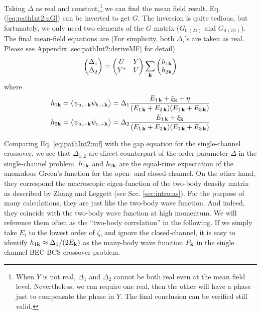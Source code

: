  
 Taking $\Delta$ as real and constant,\footnote{\label{foot:pathInt2:real}When $Y$ is not real, $\Delta_{1}$ and $\Delta_{2}$ cannot be both real even at the mean field level.  Nevertheless, we can require one  real, then the other will have a phase just to compensate the phase in $Y$.  The final conclusion can be verified  still valid.   }
  we can find the mean field result. Eq. (\ref{eq:pathInt2:nG}) can be inverted to get $G$.  The inversion is quite tedious, but fortunately, we only need two elements of the $G$ matrix ($G_{0\, (21)}$ and $G_{0 \,(31)}$).  The final mean-field equations are (For simplicity,  both $\Delta_{i}$'s are taken as real. Please see Appendix \ref{sec:pathInt2:deriveMF} for detail) 
  \begin{equation}\label{eq:pathInt2:mf}
\begin{pmatrix}\Delta_1\\\Delta_2\end{pmatrix}=\begin{pmatrix}U&Y\\Y^{*}&V\end{pmatrix}\sum_{\mathbf{k}}\begin{pmatrix}h_{1\mathbf{k}}\\h_{2\mathbf{k}}\end{pmatrix}
\end{equation}
  where 
  \begin{gather}
  h_{1\mathbf{k}}=\bigl<{\psi_{a,-{\mathbf{k}}}\psi_{b,+{\mathbf{k}}}}\bigr>
  =\Delta_{1}\frac{E_{1\,\mathbf{k}}+\xi_{\mathbf{k}}+\eta}{(E_{1\,\mathbf{k}}+E_{2\,\mathbf{k}})(E_{1\,\mathbf{k}}+E_{3\,\mathbf{k}})}\label{eq:pathInt2:h1}\\
  h_{2\mathbf{k}}=\bigl<{\psi_{a,-{\mathbf{k}}}\psi_{c,+{\mathbf{k}}}}\bigr>
  =\Delta_{2}\frac{E_{1\,\mathbf{k}}+\xi_{\mathbf{k}}}{(E_{1\,\mathbf{k}}+E_{2\,\mathbf{k}})(E_{1\,\mathbf{k}}+E_{3\,\mathbf{k}})}\label{eq:pathInt2:h2}
  \end{gather}


Comparing Eq. \ref{eq:pathInt2:mf} with the gap equation for the single-channel crossover, we  see that $\Delta_{1,2}$ are  direct counterpart of the order parameter $\Delta$ in the single-channel problem. 
$h_{1\mathbf{k}}$ and $h_{2\mathbf{k}}$ are the equal-time  expectation of the anomalous Green's function for the open- and closed-channel. On the other hand, they correspond the macroscopic eigen-function of the two-body density matrix as described by Zhang and Leggett\cite{ZhangThesis,shizhongUniv} (see Sec. \ref{sec:intro:as}). For the purpose of many calculations, they are just like the two-body wave function. And indeed, they coincide with the two-body wave function at high momentum.  We will reference them often as the ``two-body correlation'' in the following.  
If we simply take $E_{i}$ to the lowest order of $\zeta$, and ignore the closed-channel, it is easy to identify $h_{1\mathbf{k}}\approx{\Delta_{1}}/(2E_{\mathbf{k}})$ as the many-body wave function $F_{\mathbf{k}}$ in the single channel BEC-BCS crossover problem.  


